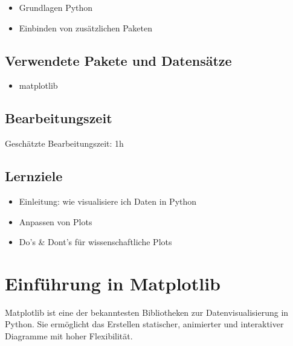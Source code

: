 \documentclass[
  letterpaper,
  DIV=11,
  numbers=noendperiod]{scrreprt}
\providecommand{\tightlist}{%
  \setlength{\itemsep}{0pt}\setlength{\parskip}{0pt}}\usepackage{longtable,booktabs,array}
\begin{document}
\begin{itemize}
\tightlist
\item
  Grundlagen Python
\item
  Einbinden von zusätzlichen Paketen
\end{itemize}

\section*{Verwendete Pakete und
Datensätze}\label{verwendete-pakete-und-datensuxe4tze}


\begin{itemize}
\tightlist
\item
  matplotlib
\end{itemize}

\section*{Bearbeitungszeit}\label{bearbeitungszeit}


Geschätzte Bearbeitungszeit: 1h

\section*{Lernziele}\label{lernziele-1}


\begin{itemize}
\tightlist
\item
  Einleitung: wie visualisiere ich Daten in Python
\item
  Anpassen von Plots
\item
  Do's \& Dont's für wissenschaftliche Plots
\end{itemize}

\chapter{Einführung in Matplotlib}\label{einfuxfchrung-in-matplotlib}

Matplotlib ist eine der bekanntesten Bibliotheken zur
Datenvisualisierung in Python. Sie ermöglicht das Erstellen statischer,
animierter und interaktiver Diagramme mit hoher Flexibilität.
\end{document}
